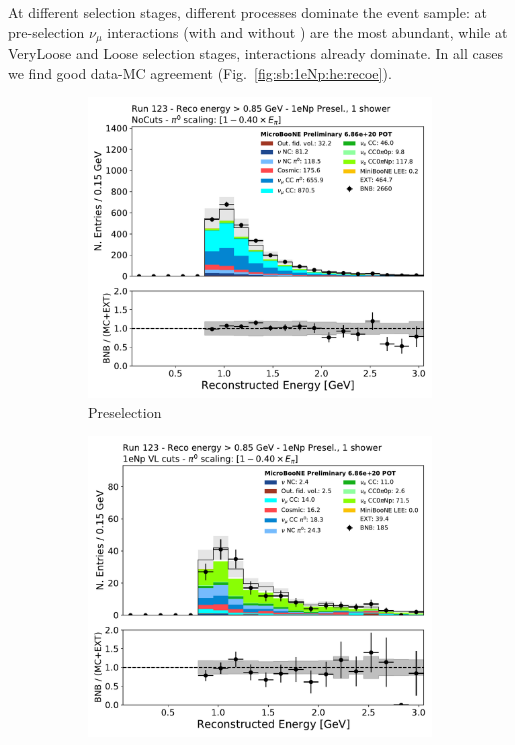At different selection stages, different processes dominate the event sample: at pre-selection $\nu_\mu$ interactions (with and without \pizero) are the most abundant, while at VeryLoose and Loose selection stages, \nuecc interactions already dominate. In all cases we find good data-MC agreement (Fig.~\ref{fig:sb:1eNp:he:recoe}).

\begin{figure}[H]
    \begin{center}
    \begin{subfigure}{0.32\textwidth}
    \includegraphics[width=1.00\textwidth]{Sidebands/Figures/1eNp/HighEnergy/HiEext_NPOneShr_None_pi0e040/reco_e_extended.pdf}
    \caption{\npsel Preselection}
    \end{subfigure}
    \begin{subfigure}{0.32\textwidth}
    \includegraphics[width=1.00\textwidth]{Sidebands/Figures/1eNp/HighEnergy/HiEext_NPOneShr_NPVL_pi0e040/reco_e_extended.pdf}

\end{subfigure}
\end{center}
\end{figure}
